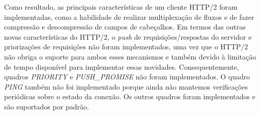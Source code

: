 Como resultado, as principais características de um cliente HTTP/2 foram implementadas, como a habilidade de realizar multiplexação de fluxos e de fazer compressão e descompressão de campos de cabeçalhos. Em termos das outras novas características do HTTP/2, o {\em push} de requisições\slash respostas do servidor e priorizações de requisições não foram implementados, uma vez que o HTTP/2 não obriga o suporte para ambos esses mecanismos e também devido à limitação de tempo disponível para implementar essas novidades. Consequentemente, quadros {\em PRIORITY} e {\em PUSH\_PROMISE} não foram implementados. O quadro {\em PING} também não foi implementado porque ainda não mantemos verificações periódicas sobre o estado da conexão. Os outros quadros foram implementados e são suportados por padrão.